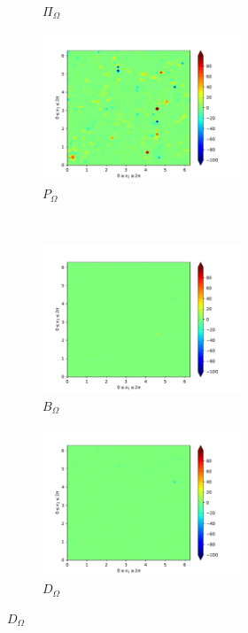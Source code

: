 \begin{figure}[H]
\begin{subfigure}{0.45\textwidth}
        \caption{$\Pi_{\Omega}$}
    \end{subfigure}
    \newline
    \begin{subfigure}{0.45\textwidth}
        \includegraphics[height=1.75in]{media/run-cds-65/P-enst-1318}
        \caption{$P_{\Omega}$}
    \end{subfigure}
    ~
    \begin{subfigure}{0.45\textwidth}
        \includegraphics[height=1.75in]{media/run-cds-65/B-enst-1318}
        \caption{$B_{\Omega}$}
    \end{subfigure}
    \newline
    \begin{subfigure}{0.45\textwidth}
        \includegraphics[height=1.75in]{media/run-cds-65/D-enst-1318}
        \caption{$D_{\Omega}$}
    \end{subfigure}
\end{figure}


\newpage

